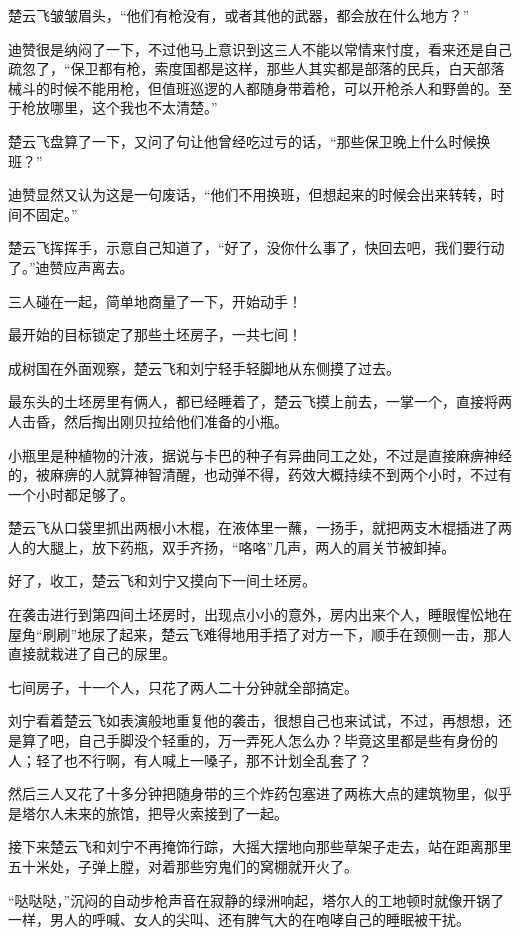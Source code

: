 楚云飞皱皱眉头，“他们有枪没有，或者其他的武器，都会放在什么地方？”

迪赞很是纳闷了一下，不过他马上意识到这三人不能以常情来忖度，看来还是自己疏忽了，“保卫都有枪，索度国都是这样，那些人其实都是部落的民兵，白天部落械斗的时候不能用枪，但值班巡逻的人都随身带着枪，可以开枪杀人和野兽的。至于枪放哪里，这个我也不太清楚。”

楚云飞盘算了一下，又问了句让他曾经吃过亏的话，“那些保卫晚上什么时候换班？”

迪赞显然又认为这是一句废话，“他们不用换班，但想起来的时候会出来转转，时间不固定。”

楚云飞挥挥手，示意自己知道了，“好了，没你什么事了，快回去吧，我们要行动了。”迪赞应声离去。

三人碰在一起，简单地商量了一下，开始动手！

最开始的目标锁定了那些土坯房子，一共七间！

成树国在外面观察，楚云飞和刘宁轻手轻脚地从东侧摸了过去。

最东头的土坯房里有俩人，都已经睡着了，楚云飞摸上前去，一掌一个，直接将两人击昏，然后掏出刚贝拉给他们准备的小瓶。

小瓶里是种植物的汁液，据说与卡巴的种子有异曲同工之处，不过是直接麻痹神经的，被麻痹的人就算神智清醒，也动弹不得，药效大概持续不到两个小时，不过有一个小时都足够了。

楚云飞从口袋里抓出两根小木棍，在液体里一蘸，一扬手，就把两支木棍插进了两人的大腿上，放下药瓶，双手齐扬，“咯咯”几声，两人的肩关节被卸掉。

好了，收工，楚云飞和刘宁又摸向下一间土坯房。

在袭击进行到第四间土坯房时，出现点小小的意外，房内出来个人，睡眼惺忪地在屋角“刷刷”地尿了起来，楚云飞难得地用手捂了对方一下，顺手在颈侧一击，那人直接就栽进了自己的尿里。

七间房子，十一个人，只花了两人二十分钟就全部搞定。

刘宁看着楚云飞如表演般地重复他的袭击，很想自己也来试试，不过，再想想，还是算了吧，自己手脚没个轻重的，万一弄死人怎么办？毕竟这里都是些有身份的人；轻了也不行啊，有人喊上一嗓子，那不计划全乱套了？

然后三人又花了十多分钟把随身带的三个炸药包塞进了两栋大点的建筑物里，似乎是塔尔人未来的旅馆，把导火索接到了一起。

接下来楚云飞和刘宁不再掩饰行踪，大摇大摆地向那些草架子走去，站在距离那里五十米处，子弹上膛，对着那些穷鬼们的窝棚就开火了。

“哒哒哒，”沉闷的自动步枪声音在寂静的绿洲响起，塔尔人的工地顿时就像开锅了一样，男人的呼喊、女人的尖叫、还有脾气大的在咆哮自己的睡眠被干扰。

